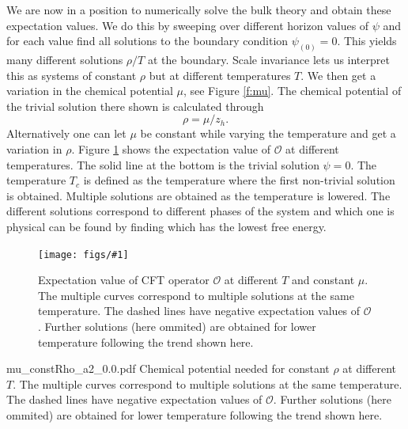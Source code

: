 \documentclass[12pt]{report}
\newcommand{\fig}[3]{
\begin{figure}
\centering
\texttt{[image: figs/\#1]}
\caption{#2}
\end{figure}
}
\begin{document}
We are now in a position to numerically solve the bulk theory and obtain these expectation values. We do this by sweeping over different horizon values of $\psi$ and for each value find all solutions to the boundary condition $\psi_{(0)}=0$. This yields many different solutions $\rho/T$ at the boundary. Scale invariance lets us interpret this as systems of constant $\rho$ but at different temperatures $T$. We then get a variation in the chemical potential $\mu$, see Figure \ref{f:mu}. The chemical potential of the trivial solution there shown is calculated through
\begin{equation}
 \rho=\mu/z_h.
\end{equation}
Alternatively one can let $\mu$ be constant while varying the temperature and get a variation in $\rho$. Figure \ref{f:O} shows the expectation value of $\mathcal{O}$ at different temperatures. The solid line at the bottom is the trivial solution $\psi=0$. The temperature $T_c$ is defined as the temperature where the first non-trivial solution is obtained. Multiple solutions are obtained as the temperature is lowered. The different solutions correspond to different phases of the system and which one is physical can be found by finding which has the lowest free energy.

\fig{O_constRho_a2_0.0.pdf}{Expectation value of CFT operator $\mathcal{O}$ at different $T$ and constant $\mu$. The multiple curves correspond to multiple solutions at the same temperature. The dashed lines have negative expectation values of $\mathcal{O}$. Further solutions (here ommited) are obtained for lower temperature following the trend shown here.\label{f:O}}

\fig{mu_constRho_a2_0.0.pdf}{
Chemical potential needed for constant $\rho$ at different $T$. The multiple curves correspond to multiple solutions at the same temperature. The dashed lines have negative expectation values of $\mathcal{O}$. Further solutions (here ommited) are obtained for lower temperature following the trend shown here.\label{f:mu}
}
\end{document}
